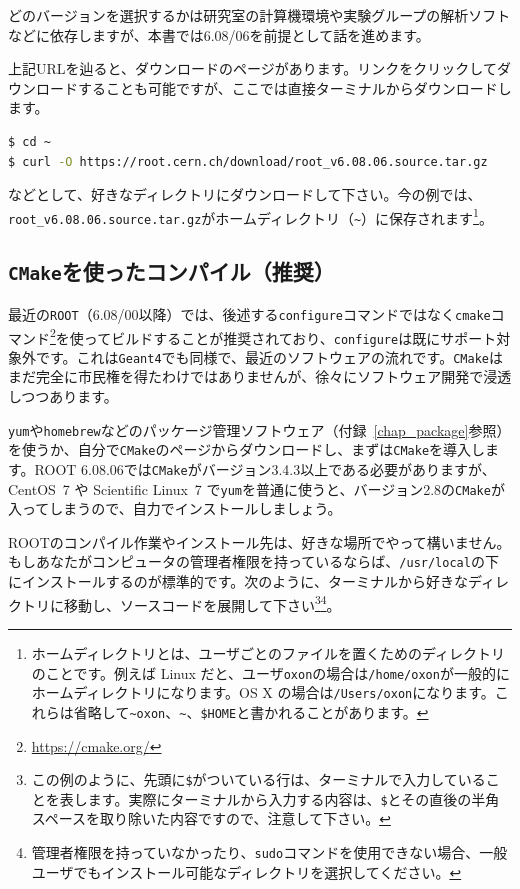 どのバージョンを選択するかは研究室の計算機環境や実験グループの解析ソフトなどに依存しますが、本書では6.08/06を前提として話を進めます。

上記URLを辿ると、ダウンロードのページがあります。リンクをクリックしてダウンロードすることも可能ですが、ここでは直接ターミナルからダウンロードします。
\begin{lstlisting}[language=bash]
$ cd ~
$ curl -O https://root.cern.ch/download/root_v6.08.06.source.tar.gz
\end{lstlisting}
などとして、好きなディレクトリにダウンロードして下さい。今の例では、\texttt{root\_v6.08.06.source.tar.gz}がホームディレクトリ（\texttt{\~}）に保存されます\footnote{ホームディレクトリとは、ユーザごとのファイルを置くためのディレクトリのことです。例えば Linux だと、ユーザ\texttt{oxon}の場合は\texttt{/home/oxon}が一般的にホームディレクトリになります。OS X の場合は\texttt{/Users/oxon}になります。これらは省略して\texttt{{\textasciitilde}oxon}、\texttt{\textasciitilde}、\texttt{\$HOME}と書かれることがあります。}。

\subsection{\texttt{CMake}を使ったコンパイル（推奨）}
\label{subsec_compile_cmake}
最近の\texttt{ROOT}（6.08/00以降）では、後述する\texttt{configure}コマンドではなく\texttt{cmake}コマンド\footnote{\url{https://cmake.org/}}を使ってビルドすることが推奨されており、\texttt{configure}は既にサポート対象外です。これは\texttt{Geant4}でも同様で、最近のソフトウェアの流れです。\texttt{CMake}はまだ完全に市民権を得たわけではありませんが、徐々にソフトウェア開発で浸透しつつあります。

\texttt{yum}や\texttt{homebrew}などのパッケージ管理ソフトウェア（付録~\ref{chap_package}参照）を使うか、自分で\texttt{CMake}のページからダウンロードし、まずは\texttt{CMake}を導入します。ROOT 6.08.06では\texttt{CMake}がバージョン3.4.3以上である必要がありますが、CentOS~7 や Scientific Linux~7 で\texttt{yum}を普通に使うと、バージョン2.8の\texttt{CMake}が入ってしまうので、自力でインストールしましょう。

ROOTのコンパイル作業やインストール先は、好きな場所でやって構いません。もしあなたがコンピュータの管理者権限を持っているならば、\texttt{/usr/local}の下にインストールするのが標準的です。次のように、ターミナルから好きなディレクトリに移動し、ソースコードを展開して下さい\footnote{この例のように、先頭に\texttt{\$}がついている行は、ターミナルで入力していることを表します。実際にターミナルから入力する内容は、\texttt{\$}とその直後の半角スペースを取り除いた内容ですので、注意して下さい。}\footnote{管理者権限を持っていなかったり、\texttt{sudo}コマンドを使用できない場合、一般ユーザでもインストール可能なディレクトリを選択してください。}。

